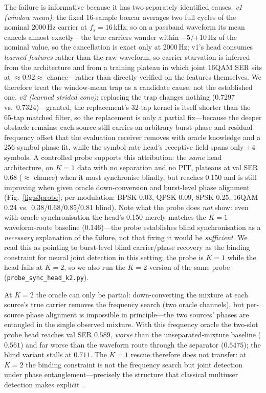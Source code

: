 \documentclass[review,12pt]{elsarticle}
\begin{document}
The failure is informative because it has two separately identified
causes. \emph{v1 (window mean)}: the fixed 16-sample boxcar averages
two full cycles of the nominal 2000\,Hz carrier at $f_s = 16$\,kHz, so
on a passband waveform its mean cancels almost exactly---the true
carriers wander within $-5$/$+10$\,Hz of the nominal value, so the
cancellation is exact only at 2000\,Hz; v1's head consumes
\emph{learned features} rather than the raw waveform, so carrier
starvation is inferred---from the architecture and from a training
plateau in which joint 16QAM SER sits at $\approx 0.92 \approx$
chance---rather than directly verified on the features themselves.
We therefore treat the window-mean trap as a candidate cause, not the
established one. \emph{v2 (learned strided conv)}:
replacing the trap changes nothing (0.7297 vs.\ 0.7324)---granted, the
replacement's 32-tap kernel is itself shorter than the 65-tap matched
filter, so the replacement is only a partial fix---because the
deeper obstacle remains: each source still carries an arbitrary burst
phase and residual frequency offset that the evaluation receiver removes
with oracle knowledge and a 256-symbol phase fit, while the symbol-rate
head's receptive field spans only $\pm 4$ symbols. A controlled probe
supports this attribution: the \emph{same} head architecture, on $K{=}1$
data with no separation and no PIT, plateaus at val SER 0.68 ($\approx$
chance) when it must synchronise blindly, but reaches 0.150 and is still
improving when given oracle down-conversion and burst-level phase
alignment (Fig.~\ref{fig:s3probe}; per-modulation: BPSK 0.03, QPSK 0.09,
8PSK 0.25, 16QAM 0.24 vs.\ 0.38/0.68/0.85/0.81 blind). Note what the
probe does \emph{not} show: even with oracle synchronisation the head's
0.150 merely matches the $K{=}1$ waveform-route baseline (0.146)---the
probe establishes blind synchronisation as a \emph{necessary}
explanation of the failure, not that fixing it would be
\emph{sufficient}. We read this as
pointing to burst-level blind carrier/phase recovery as the binding
constraint for neural joint detection in this setting; the probe is
$K{=}1$ while the head fails at $K{=}2$, so we also run the $K{=}2$
version of the same probe (\texttt{probe\_sync\_head\_k2.py}).

At $K{=}2$ the oracle can only be partial: down-converting the mixture
at each source's true carrier removes the frequency search (two oracle
channels), but per-source phase alignment is impossible in
principle---the two sources' phases are entangled in the single
observed mixture. With this frequency oracle the two-slot probe head
reaches val SER $0.589$, \emph{worse} than the unseparated-mixture
baseline ($0.561$) and far worse than the waveform route through the
separator ($0.5475$); the blind variant stalls at $0.711$. The $K{=}1$
rescue therefore does not transfer: at $K{=}2$ the binding constraint
is not the frequency search but joint detection under phase
entanglement---precisely the structure that classical multiuser
detection makes explicit~\cite{verdu1998multiuser,dankberg1998pcma}.
\end{document}
